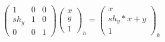 \documentclass{article}
\begin{document}
\begin{align*}
\begin{pmatrix}1&0&0\\sh_y&1&0\\0&0&1\end{pmatrix}\begin{pmatrix}x\\y\\1\end{pmatrix}_h=\begin{pmatrix}x\\sh_y*x+y\\1\end{pmatrix}_h
\end{align*}
\end{document}
